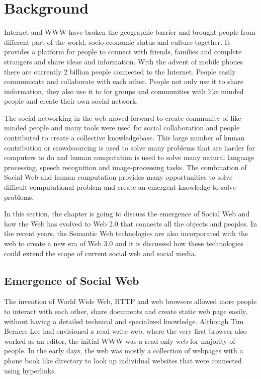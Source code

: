 

\chapter{Background} \label{Chapter:Background}
Internet and WWW have broken the geographic barrier and brought people from different part of the world, socio-economic status and culture together. It provides a platform for people to connect with friends, families and complete strangers and share ideas and information. With the advent of mobile phones there are currently 2 billion people connected to the Internet. People easily communicate and collaborate with each other. People not only use it to share imformation, they also use it to for groups and communities with like minded people and create their own social network.


The social networking in the web moved forward to create community of like minded people and many tools were used for social collaboration and people contributed to create a collective knowledgebase. This large number of human contribution or crowdsourcing is used to solve many problems that are harder for computers to do and human computation is used to solve many natural language processing, speech recognition and image-processing tasks. The combination of Social Web and human computation provides many opportunities to solve difficult computational problem and create an emergent knowledge to solve problems.


In this section, the chapter is going to discuss the emergence of Social Web and how the Web has evolved to Web 2.0 that connects all the objects and peoples. In the recent years, the Semantic Web technologies are also incorporated with the web to create a new era of Web 3.0 and it is discussed how these technologies could extend the scope of current social web and social media.


\section{Emergence of Social Web}

The invention of World Wide Web, HTTP and web browsers allowed more people to interact with each other, share documents and create static web page easily, without having a detailed technical and specialized knowledge. Although Tim Berners-Lee had envisioned a read-write web, where the very first browser also worked as an editor, the initial WWW was a read-only web for majority of people. In the early days, the web was mostly a collection of webpages with a phone book like directory to look up individual websites that were connected using hyperlinks.


